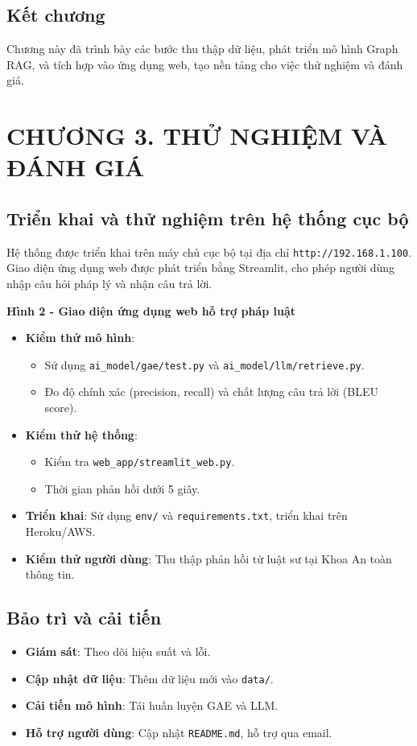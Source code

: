 \documentclass[a4paper,12pt]{article}
\begin{document}
\subsection{Kết chương}
Chương này đã trình bày các bước thu thập dữ liệu, phát triển mô hình Graph RAG, và tích hợp vào ứng dụng web, tạo nền tảng cho việc thử nghiệm và đánh giá.
\clearpage

\section{CHƯƠNG 3. THỬ NGHIỆM VÀ ĐÁNH GIÁ}
\subsection{Triển khai và thử nghiệm trên hệ thống cục bộ}
Hệ thống được triển khai trên máy chủ cục bộ tại địa chỉ \texttt{http://192.168.1.100}. Giao diện ứng dụng web được phát triển bằng Streamlit, cho phép người dùng nhập câu hỏi pháp lý và nhận câu trả lời.

\textbf{Hình 2 - Giao diện ứng dụng web hỗ trợ pháp luật}

\begin{itemize}
    \item \textbf{Kiểm thử mô hình}:
    \begin{itemize}
        \item Sử dụng \texttt{ai\_model/gae/test.py} và \texttt{ai\_model/llm/retrieve.py}.
        \item Đo độ chính xác (precision, recall) và chất lượng câu trả lời (BLEU score).
    \end{itemize}
    \item \textbf{Kiểm thử hệ thống}:
    \begin{itemize}
        \item Kiểm tra \texttt{web\_app/streamlit\_web.py}.
        \item Thời gian phản hồi dưới 5 giây.
    \end{itemize}
    \item \textbf{Triển khai}: Sử dụng \texttt{env/} và \texttt{requirements.txt}, triển khai trên Heroku/AWS.
    \item \textbf{Kiểm thử người dùng}: Thu thập phản hồi từ luật sư tại Khoa An toàn thông tin.
\end{itemize}

\subsection{Bảo trì và cải tiến}
\begin{itemize}
    \item \textbf{Giám sát}: Theo dõi hiệu suất và lỗi.
    \item \textbf{Cập nhật dữ liệu}: Thêm dữ liệu mới vào \texttt{data/}.
    \item \textbf{Cải tiến mô hình}: Tái huấn luyện GAE và LLM.
    \item \textbf{Hỗ trợ người dùng}: Cập nhật \texttt{README.md}, hỗ trợ qua email.
\end{itemize}
\end{document}

